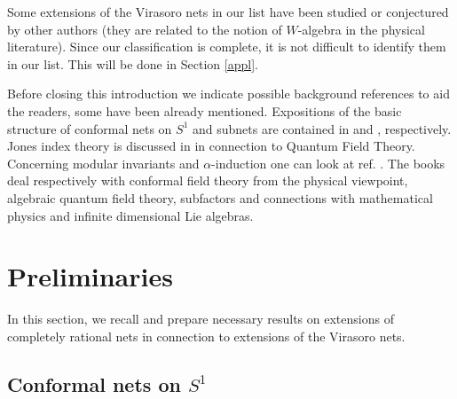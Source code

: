 \documentclass[12pt]{article}
\begin{document}
Some extensions of the Virasoro nets
in our list have been studied
or conjectured by other authors \cite{BE,X6} (they are related to the 
notion of $W$-algebra in the physical literature).  Since our classification 
is complete, it is not difficult to identify
them in our list.  This will be done in Section \ref{appl}.

Before closing this introduction we indicate possible background references 
to aid the readers, some have been already mentioned. 
Expositions of the basic structure of conformal nets 
on $S^1$ and subnets are contained in \cite{GL2} and \cite{LR}, respectively. 
Jones index theory \cite{J} is discussed in \cite{L1} in connection to 
Quantum Field Theory. Concerning modular invariants and 
$\alpha$-induction one can look at ref. \cite{BE,BEK1,BEK2}. The books
\cite{DMS,H,EK,KR} deal respectively with conformal field theory from
the physical viewpoint, algebraic quantum field theory, subfactors and 
connections with mathematical physics and infinite dimensional Lie algebras.

\section{Preliminaries}
\label{prelim}

In this section, we recall and prepare necessary results on
extensions of completely rational nets in
connection to extensions of the Virasoro nets.

\subsection{Conformal nets on $S^1$}
\label{nets}
\end{document}
